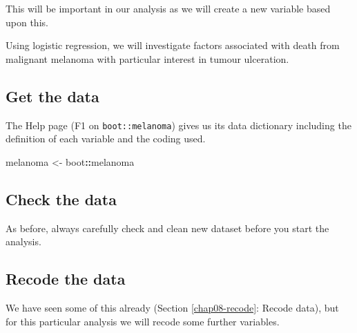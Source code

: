 \documentclass[
  12pt,
  krantz2]{krantz}
\makeatletter
\newenvironment{Shaded}{\begin{snugshade}}{\end{snugshade}}
\newcommand{\KeywordTok}[1]{\textcolor[rgb]{0.13,0.29,0.53}{\textbf{#1}}}
\newcommand{\NormalTok}[1]{#1}
\newcommand{\OperatorTok}[1]{\textcolor[rgb]{0.81,0.36,0.00}{\textbf{#1}}}
\newcommand{\StringTok}[1]{\textcolor[rgb]{0.31,0.60,0.02}{#1}}
\newenvironment{kframe}{%
\medskip{}
\setlength{\fboxsep}{.8em}
 \def\at@end@of@kframe{}%
 \ifinner\ifhmode%
  \def\at@end@of@kframe{\end{minipage}}%
  \begin{minipage}{\columnwidth}%
 \fi\fi%
 \def\FrameCommand##1{\hskip\@totalleftmargin \hskip-\fboxsep
 \colorbox{shadecolor}{##1}\hskip-\fboxsep
     \hskip-\linewidth \hskip-\@totalleftmargin \hskip\columnwidth}%
 \MakeFramed {\advance\hsize-\width
   \@totalleftmargin\z@ \linewidth\hsize
   \@setminipage}}%
 {\par\unskip\endMakeFramed%
 \at@end@of@kframe}
\renewenvironment{Shaded}{\begin{kframe}}{\end{kframe}}
\makeatother
\begin{document}
This will be important in our analysis as we will create a new variable based upon this.

Using logistic regression, we will investigate factors associated with death from malignant melanoma with particular interest in tumour ulceration.

\hypertarget{get-the-data-5}{%
\subsection{Get the data}\label{get-the-data-5}}

The Help page (F1 on \texttt{boot::melanoma}) gives us its data dictionary including the definition of each variable and the coding used.

\begin{Shaded}
\begin{Highlighting}[]
\NormalTok{melanoma <-}\StringTok{ }\NormalTok{boot}\OperatorTok{::}\NormalTok{melanoma}
\end{Highlighting}
\end{Shaded}

\hypertarget{check-the-data-3}{%
\subsection{Check the data}\label{check-the-data-3}}

As before, always carefully check and clean new dataset before you start the analysis.

\begin{Shaded}
\end{Shaded}

\hypertarget{recode-the-data}{%
\subsection{Recode the data}\label{recode-the-data}}

We have seen some of this already (Section \ref{chap08-recode}: Recode data), but for this particular analysis we will recode some further variables.
\end{document}
